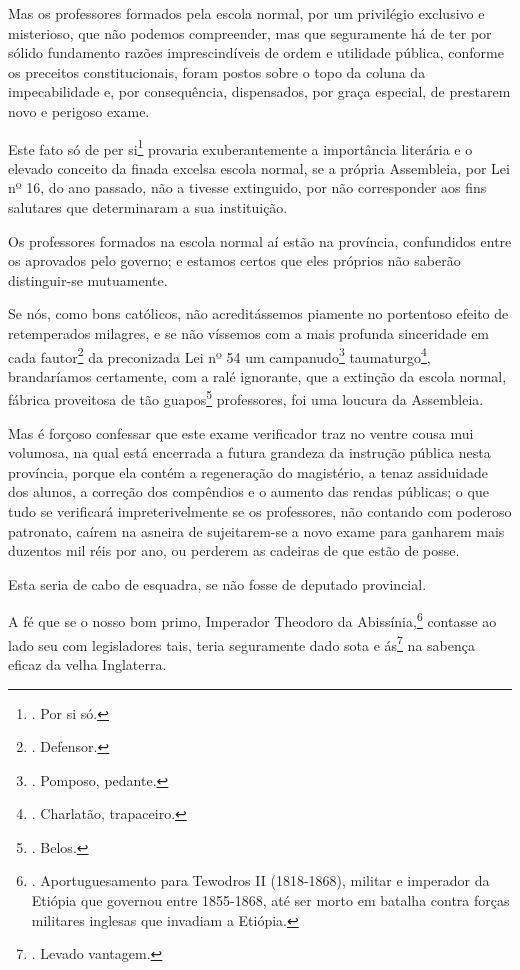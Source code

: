 Mas os professores formados pela escola normal, por um privilégio
exclusivo e misterioso, que não podemos compreender, mas que seguramente
há de ter por sólido fundamento razões imprescindíveis de ordem e
utilidade pública, conforme os preceitos constitucionais, foram postos
sobre o topo da coluna da impecabilidade e, por consequência,
dispensados, por graça especial, de prestarem novo e perigoso exame.

Este fato só de per si\footnote{. Por si só.} provaria exuberantemente a
importância literária e o elevado conceito da finada excelsa escola
normal, se a própria Assembleia, por Lei nº 16, do ano passado, não a
tivesse extinguido, por não corresponder aos fins salutares que
determinaram a sua instituição.

Os professores formados na escola normal aí estão na província,
confundidos entre os aprovados pelo governo; e estamos certos que eles
próprios não saberão distinguir-se mutuamente.

Se nós, como bons católicos, não acreditássemos piamente no portentoso
efeito de retemperados milagres, e se não víssemos com a mais profunda
sinceridade em cada fautor\footnote{. Defensor.} da preconizada Lei nº
54 um campanudo\footnote{. Pomposo, pedante.} taumaturgo\footnote{.
  Charlatão, trapaceiro.}, brandaríamos certamente, com a ralé
ignorante, que a extinção da escola normal, fábrica proveitosa de tão
guapos\footnote{. Belos.} professores, foi uma loucura da Assembleia.

Mas é forçoso confessar que este exame verificador traz no ventre cousa
mui volumosa, na qual está encerrada a futura grandeza da instrução
pública nesta província, porque ela contém a regeneração do magistério,
a tenaz assiduidade dos alunos, a correção dos compêndios e o aumento
das rendas públicas; o que tudo se verificará impreterivelmente se os
professores, não contando com poderoso patronato, caírem na asneira de
sujeitarem-se a novo exame para ganharem mais duzentos mil réis por ano,
ou perderem as cadeiras de que estão de posse.

Esta seria de cabo de esquadra, se não fosse de deputado provincial.

A fé que se o nosso bom primo, Imperador Theodoro da
Abissínia,\footnote{. Aportuguesamento para Tewodros II (1818-1868),
  militar e imperador da Etiópia que governou entre 1855-1868, até ser
  morto em batalha contra forças militares inglesas que invadiam a
  Etiópia.} contasse ao lado seu com legisladores tais, teria
seguramente dado sota e ás\footnote{. Levado vantagem.} na sabença
eficaz da velha Inglaterra.

